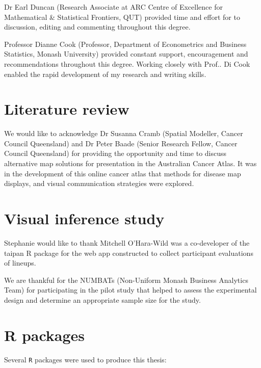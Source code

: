 \documentclass{monashthesis}
\begin{document}
Dr Earl Duncan (Research Associate at ARC Centre of Excellence for Mathematical \& Statistical Frontiers, QUT) provided time and effort for to discussion, editing and commenting throughout this degree.

Professor Dianne Cook (Professor, Department of Econometrics and Business Statistics, Monash University) provided constant support, encouragement and recommendations throughout this degree.
Working closely with Prof.. Di Cook enabled the rapid development of my research and writing skills.

\hypertarget{literature-review}{%
\section{Literature review}\label{literature-review}}

We would like to acknowledge Dr Susanna Cramb (Spatial Modeller, Cancer Council Queensland) and Dr Peter Baade (Senior Research Fellow, Cancer Council Queensland) for providing the opportunity and time to discuss alternative map solutions for presentation in the Australian Cancer Atlas.
It was in the development of this online cancer atlas that methods for disease map displays, and visual communication strategies were explored.

\hypertarget{visual-inference-study}{%
\section{Visual inference study}\label{visual-inference-study}}

Stephanie would like to thank Mitchell O'Hara-Wild was a co-developer of the taipan \autocite{taipan} R package for the web app constructed to collect participant evaluations of lineups.

We are thankful for the NUMBATs (Non-Uniform Monash Business Analytics Team) for participating in the pilot study that helped to assess the experimental design and determine an appropriate sample size for the study.

\hypertarget{r-packages}{%
\section{R packages}\label{r-packages}}

Several \texttt{R} \autocite{R} packages were used to produce this thesis:
\end{document}
